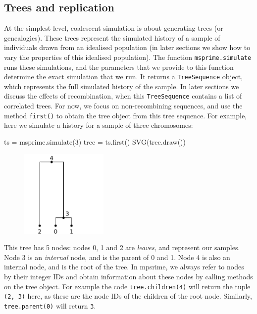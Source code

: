 \documentclass[graybox]{svmult}
\begin{document}
\subsection{Trees and replication}
At the simplest level, coalescent simulation is about generating trees (or genealogies).
These trees represent the simulated history of a sample of individuals
drawn from an idealised population (in later sections we show how to
vary the properties of this idealised population). The function
\texttt{msprime.simulate} runs these simulations, and the parameters
that we provide to this function determine the exact simulation that we
run. It returns a \texttt{TreeSequence} object, which represents the
full simulated history of the sample. In later sections we discuss the
effects of recombination, when this \texttt{TreeSequence} contains a
list of correlated trees. For now, we focus on non-recombining sequences, and use the method \texttt{first()} to obtain the
tree object from this tree sequence. For example, here we simulate a
history for a sample of three chromosomes:

\begin{pythoncode}
ts = msprime.simulate(3)
tree = ts.first()
SVG(tree.draw())
\end{pythoncode}

\begin{figure}
  \begin{center}
    \includegraphics[width=0.38\textwidth]{images/simulations_5_0.pdf}
  \end{center}
\end{figure}

    This tree has 5 nodes: nodes 0, 1 and 2 are \emph{leaves}, and
represent our samples. Node 3 is an \emph{internal} node, and is the
parent of 0 and 1. Node 4 is also an internal node, and is the root of
the tree. In mpsrime, we always refer to nodes by their integer IDs and
obtain information about these nodes by calling methods on the tree
object. For example the code \texttt{tree.children(4)} will return the
tuple \texttt{(2,\ 3)} here, as these are the node IDs of the children
of the root node. Similarly, \texttt{tree.parent(0)} will return
\texttt{3}.
\end{document}
